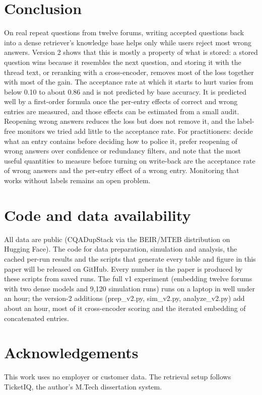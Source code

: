 \documentclass[11pt]{article}
\begin{document}
\section{Conclusion}
On real repeat questions from twelve forums, writing accepted questions back into a dense retriever's knowledge base helps only while users reject most wrong answers. Version 2 shows that this is mostly a property of what is stored: a stored question wins because it resembles the next question, and storing it with the thread text, or reranking with a cross-encoder, removes most of the loss together with most of the gain. The acceptance rate at which it starts to hurt varies from below 0.10 to about 0.86 and is not predicted by base accuracy. It is predicted well by a first-order formula once the per-entry effects of correct and wrong entries are measured, and those effects can be estimated from a small audit. Reopening wrong answers reduces the loss but does not remove it, and the label-free monitors we tried add little to the acceptance rate. For practitioners: decide what an entry contains before deciding how to police it, prefer reopening of wrong answers over confidence or redundancy filters, and note that the most useful quantities to measure before turning on write-back are the acceptance rate of wrong answers and the per-entry effect of a wrong entry. Monitoring that works without labels remains an open problem.

\section*{Code and data availability}
All data are public (CQADupStack via the BEIR/MTEB distribution on Hugging Face). The code for data preparation, simulation and analysis, the cached per-run results and the scripts that generate every table and figure in this paper will be released on GitHub. Every number in the paper is produced by these scripts from saved runs. The full v1 experiment (embedding twelve forums with two dense models and 9{,}120 simulation runs) runs on a laptop in well under an hour; the version-2 additions (prep\_v2.py, sim\_v2.py, analyze\_v2.py) add about an hour, most of it cross-encoder scoring and the iterated embedding of concatenated entries.

\section*{Acknowledgements}
This work uses no employer or customer data. The retrieval setup follows TicketIQ, the author's M.Tech dissertation system.
\end{document}
